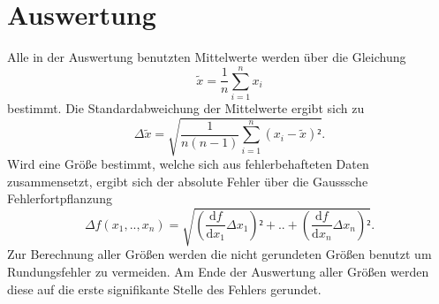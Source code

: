 \section{Auswertung}
\label{sec:Auswertung}
Alle in der Auswertung benutzten Mittelwerte werden über die Gleichung
\begin{equation}
\tilde{x}=\frac{1}{n}\sum_{i=1}^n {x_i}
\end{equation}
bestimmt. Die Standardabweichung der Mittelwerte ergibt sich zu 
\begin{equation}
\Delta{\tilde{x}}=\sqrt{\frac{1}{n(n-1)}\sum_{i=1}^n {(x_i-\tilde{x})²}}.
\end{equation}
Wird eine Größe bestimmt, welche sich aus fehlerbehafteten Daten zusammensetzt, ergibt sich der absolute Fehler über die Gausssche Fehlerfortpflanzung 
\begin{equation}
\Delta{f}(x_1,..,x_n)=\sqrt{\left(\frac{\mathup{d}f}{\mathup{d}x_1}\Delta{x_1}\right)²+..+\left(\frac{\mathup{d}f}{\mathup{d}x_n}\Delta{x_n}\right)²}.
\end{equation}
Zur Berechnung aller Größen werden die nicht gerundeten Größen benutzt um Rundungsfehler zu vermeiden. Am Ende der Auswertung aller Größen werden diese auf die erste signifikante Stelle des Fehlers gerundet. 
